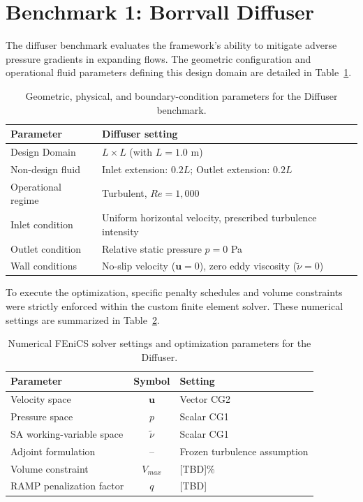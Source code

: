 \section{Benchmark 1: Borrvall Diffuser}
\label{app:config_diffuser}

The diffuser benchmark evaluates the framework's ability to mitigate adverse pressure gradients in expanding flows. The geometric configuration and operational fluid parameters defining this design domain are detailed in Table~\ref{tab:app_diffuser_physical}.

\begin{table}[htbp]
	\centering
	\footnotesize
	\caption{Geometric, physical, and boundary-condition parameters for the Diffuser benchmark.}
	\label{tab:app_diffuser_physical}
	\renewcommand{\arraystretch}{1.2}
	\begin{tabularx}{\textwidth}{l X}
		\hline
		\textbf{Parameter} & \textbf{Diffuser setting} \\
		\hline
		Design Domain & $L \times L$ (with $L = 1.0$ m) \\
		Non-design fluid & Inlet extension: $0.2L$; Outlet extension: $0.2L$ \\
		Operational regime & Turbulent, $Re = 1{,}000$ \\
		Inlet condition & Uniform horizontal velocity, prescribed turbulence intensity \\
		Outlet condition & Relative static pressure $p = 0$ Pa \\
		Wall conditions & No-slip velocity ($\mathbf{u} = 0$), zero eddy viscosity ($\tilde{\nu} = 0$) \\
		\hline
	\end{tabularx}
\end{table}

To execute the optimization, specific penalty schedules and volume constraints were strictly enforced within the custom finite element solver. These numerical settings are summarized in Table~\ref{tab:app_diffuser_numerical}.

\begin{table}[htbp]
	\centering
	\footnotesize
	\caption{Numerical FEniCS solver settings and optimization parameters for the Diffuser.}
	\label{tab:app_diffuser_numerical}
	\renewcommand{\arraystretch}{1.2}
	\begin{tabularx}{\textwidth}{l c X}
		\hline
		\textbf{Parameter} & \textbf{Symbol} & \textbf{Setting} \\
		\hline
		Velocity space & $\mathbf{u}$ & Vector CG2 \\
		Pressure space & $p$ & Scalar CG1 \\
		SA working-variable space & $\tilde{\nu}$ & Scalar CG1 \\
		Adjoint formulation & -- & Frozen turbulence assumption \\
		Volume constraint & $V_{max}$ & [TBD]\% \\
		RAMP penalization factor & $q$ & [TBD] \\
		\hline
	\end{tabularx}
\end{table}

